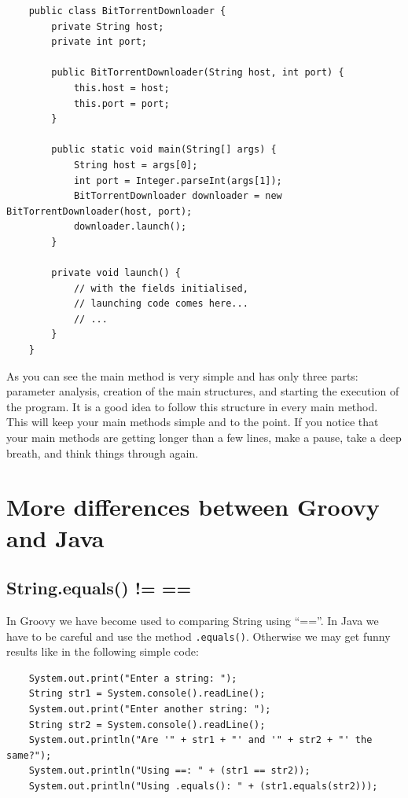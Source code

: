 \begin{verbatim}
    public class BitTorrentDownloader {
        private String host;
        private int port;
    
        public BitTorrentDownloader(String host, int port) {
            this.host = host;
            this.port = port;
        }
    
        public static void main(String[] args) {
            String host = args[0];
            int port = Integer.parseInt(args[1]);
            BitTorrentDownloader downloader = new BitTorrentDownloader(host, port);
            downloader.launch();
        }

        private void launch() {
            // with the fields initialised, 
            // launching code comes here...
            // ...
        }
    }
\end{verbatim}

As you can see the main method is very simple and has only three
parts: parameter analysis, creation of the main structures, and
starting the execution of the program. It is a good idea to follow
this structure in every main method. This will keep your main methods
simple and to the point. If you notice that your main methods are
getting longer than a few lines, make a pause, take a deep breath, and
think things through again. 

\section{More differences between Groovy and Java}
\label{sec:more-diff-betw}

\subsection{String.equals() != ==}
\label{sec:string.equals-=-==}

In Groovy we have become used to comparing String using ``==''. In
Java we have to be careful and use the method
\verb+.equals()+. Otherwise we may get funny results like in the
following simple code: 

\begin{verbatim}
    System.out.print("Enter a string: ");
    String str1 = System.console().readLine();
    System.out.print("Enter another string: ");
    String str2 = System.console().readLine();
    System.out.println("Are '" + str1 + "' and '" + str2 + "' the same?");
    System.out.println("Using ==: " + (str1 == str2));
    System.out.println("Using .equals(): " + (str1.equals(str2)));
\end{verbatim}

